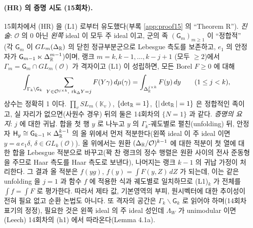 \paragraph{(HR) 의 증명 시도 (15회차).} 15회차에서 (HR) 을 (L1) 로부터 유도했다(부록 \ref{app:proof15} 의 ``Theorem R''). \emph{진술}: $\mathcal O$ 의 0 아닌 \emph{왼쪽} ideal 이 모두 주 ideal 이고, 군의 족 $(\mathsf G_m)_{m\ge1}$ 이 ``정합적'' (각 $\mathsf G_m$ 이 $GL_m(\Delta_{\mathbb{R}})$ 의 닫힌 정규부분군으로 Lebesgue 측도를 보존하고, $e_1$ 의 안정자가 $\mathsf G_{m-1}\ltimes\Delta_{\mathbb{R}}^{m-1}$)이며, 랭크 $m=k,k-1,\dots,k-j+1$ (모두 $\ge2$)에서 $\Gamma_m=\mathsf G_m\cap GL_m(\mathcal O)$ 가 격자이고 (L1) 이 성립하면, 모든 Borel $F\ge0$ 에 대해
\[
\int_{\Gamma_k\backslash\mathsf G_k}\ \sum_{Y\in\mathcal O^{j\times k},\ \mathrm{rk}_\Delta Y=j}F(Y\gamma)\,d\mu(\gamma)=\int_{\Delta_{\mathbb{R}}^{j\times k}}F(y)\,dy\qquad(1\le j<k),
\]
상수는 정확히 1 이다. $\prod_vSL_m(\mathbb K_v)$, $\{\det_{\mathbb{R}}=1\}$, $\{|\det_{\mathbb{R}}|=1\}$ 은 정합적인 족이고, 실 자리가 없으면(사원수 경우) 뒤의 둘은 14회차의 $\{N=1\}$ 과 같다. \emph{증명의 요지}: $j$ 에 대한 귀납. 합을 첫 행 $y$ 로 나누고 $y$ 의 $\Gamma_k$-궤도별로 펼친(unfolding) 뒤, 안정자 $\mathsf H_y\cong\mathsf G_{k-1}\ltimes\Delta_{\mathbb{R}}^{k-1}$ 의 올 위에서 먼저 적분한다(왼쪽 ideal 이 주 ideal 이면 $y=a\,e_1\delta$, $\delta\in GL_k(\mathcal O)$). 올 위에서는 원환 $(\Delta_{\mathbb{R}}/\mathcal O)^{k-1}$ 에 대한 적분이 첫 열에 대한 합을 Lebesgue 적분으로 바꾸고(꽉 찬 랭크의 정수 행렬은 원환 사이의 전사 준동형을 주므로 Haar 측도를 Haar 측도로 보낸다), 나머지는 랭크 $k-1$ 의 귀납 가정이 처리한다. 그 결과 올 적분은 $f(yg)$, $f(y)=\int F(y,Z)\,dZ$ 가 되는데, 이는 같은 unfolding 을 $j=1$ 과 함수 $f$ 에 적용한 식과 궤도별로 일치하므로 (L1)$_k$ 가 전체를 $\int f=\int F$ 로 평가한다. 따라서 제타 값, 기본영역의 부피, 원시벡터에 대한 추이성이 전혀 필요 없고 순환 논법도 아니다. 또 격자의 공간은 $\Gamma_k\backslash\mathsf G_k$ 로 읽어야 하며(14회차 표기의 정정), 필요한 것은 왼쪽 ideal 의 주 ideal 성인데 $\Lambda_W$ 가 unimodular 이면(Leech) 14회차의 (h1) 에서 따라온다(Lemma 4.1a).

